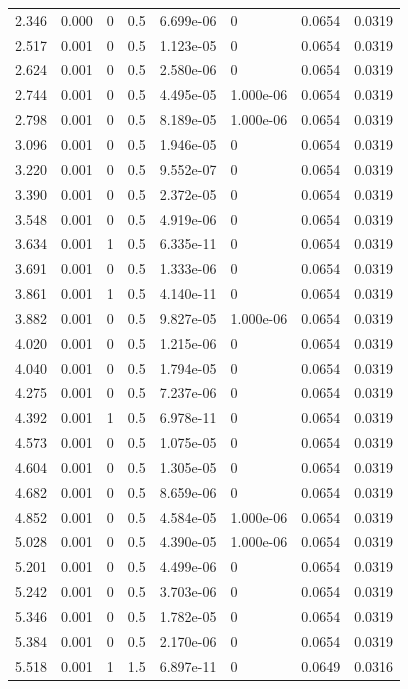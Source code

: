 \documentclass[preview]{standalone}
\begin{document}
{{\begin{tabular}{L{1.2cm}C{1.2cm} C{0.3cm}C{0.5cm} C{1.4cm}C{1.4cm} C{1.4cm}C{1.4cm}}
  2.346  &  0.000  & 0     & 0.5 &  6.699e-06  & 0  & 0.0654 &  0.0319   \\ 
  2.517  &  0.001  & 0     & 0.5 &  1.123e-05  & 0  & 0.0654 &  0.0319   \\ 
  2.624  &  0.001  & 0     & 0.5 &  2.580e-06  & 0  & 0.0654 &  0.0319   \\ 
  2.744  &  0.001  & 0     & 0.5 &  4.495e-05  & 1.000e-06  & 0.0654 &  0.0319   \\ 
  2.798  &  0.001  & 0     & 0.5 &  8.189e-05  & 1.000e-06  & 0.0654 &  0.0319   \\ 
  3.096  &  0.001  & 0     & 0.5 &  1.946e-05  & 0  & 0.0654 &  0.0319   \\ 
  3.220  &  0.001  & 0     & 0.5 &  9.552e-07  & 0  & 0.0654 &  0.0319   \\ 
  3.390  &  0.001  & 0     & 0.5 &  2.372e-05  & 0  & 0.0654 &  0.0319   \\ 
  3.548  &  0.001  & 0     & 0.5 &  4.919e-06  & 0  & 0.0654 &  0.0319   \\ 
  3.634  &  0.001  & 1     & 0.5 &  6.335e-11  & 0  & 0.0654 &  0.0319   \\ 
  3.691  &  0.001  & 0     & 0.5 &  1.333e-06  & 0  & 0.0654 &  0.0319   \\ 
  3.861  &  0.001  & 1     & 0.5 &  4.140e-11  & 0  & 0.0654 &  0.0319   \\ 
  3.882  &  0.001  & 0     & 0.5 &  9.827e-05  & 1.000e-06  & 0.0654 &  0.0319   \\ 
  4.020  &  0.001  & 0     & 0.5 &  1.215e-06  & 0  & 0.0654 &  0.0319   \\ 
  4.040  &  0.001  & 0     & 0.5 &  1.794e-05  & 0  & 0.0654 &  0.0319   \\ 
  4.275  &  0.001  & 0     & 0.5 &  7.237e-06  & 0  & 0.0654 &  0.0319   \\ 
  4.392  &  0.001  & 1     & 0.5 &  6.978e-11  & 0  & 0.0654 &  0.0319   \\ 
  4.573  &  0.001  & 0     & 0.5 &  1.075e-05  & 0  & 0.0654 &  0.0319   \\ 
  4.604  &  0.001  & 0     & 0.5 &  1.305e-05  & 0  & 0.0654 &  0.0319   \\ 
  4.682  &  0.001  & 0     & 0.5 &  8.659e-06  & 0  & 0.0654 &  0.0319   \\ 
  4.852  &  0.001  & 0     & 0.5 &  4.584e-05  & 1.000e-06  & 0.0654 &  0.0319   \\ 
  5.028  &  0.001  & 0     & 0.5 &  4.390e-05  & 1.000e-06  & 0.0654 &  0.0319   \\ 
  5.201  &  0.001  & 0     & 0.5 &  4.499e-06  & 0  & 0.0654 &  0.0319   \\ 
  5.242  &  0.001  & 0     & 0.5 &  3.703e-06  & 0  & 0.0654 &  0.0319   \\ 
  5.346  &  0.001  & 0     & 0.5 &  1.782e-05  & 0  & 0.0654 &  0.0319   \\ 
  5.384  &  0.001  & 0     & 0.5 &  2.170e-06  & 0  & 0.0654 &  0.0319   \\ 
  5.518  &  0.001  & 1     & 1.5 &  6.897e-11  & 0  & 0.0649 &  0.0316   \\ 
\hline 
\end{tabular} 

}}
\end{document}
